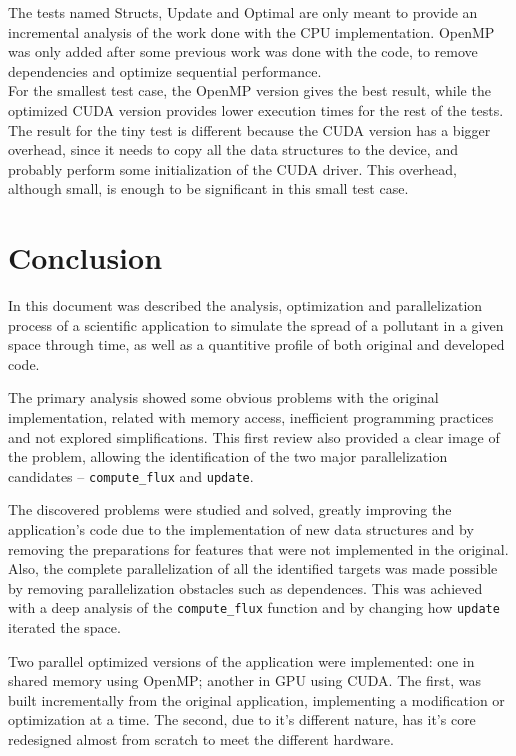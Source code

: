 \documentclass[9pt,twocolumn]{scrartcl}
\begin{document}
The tests named Structs, Update and Optimal are only meant to provide an incremental analysis of the work done with the CPU implementation. OpenMP was only added after some previous work was done with the code, to remove dependencies and optimize sequential performance.\\
For the smallest test case, the OpenMP version gives the best result, while the optimized CUDA version provides lower execution times for the rest of the tests. The result for the tiny test is different because the CUDA version has a bigger overhead, since it needs to copy all the data structures to the device, and probably perform some initialization of the CUDA driver. This overhead, although small, is enough to be significant in this small test case.

\section{Conclusion}
\label{sec:conclusion}
In this document was described the analysis, optimization and parallelization process of a scientific application to simulate the spread of a pollutant in a given space through time, as well as a quantitive profile of both original and developed code.

The primary analysis showed some obvious problems with the original implementation, related with memory access, inefficient programming practices and not explored simplifications. This first review also provided a clear image of the problem, allowing the identification of the two major parallelization candidates -- \texttt{compute\_flux} and \texttt{update}.

The discovered problems were studied and solved, greatly improving the application's code due to the implementation of new data structures and by removing the preparations for features that were not implemented in the original. Also, the complete parallelization of all the identified targets was made possible by removing parallelization obstacles such as dependences. This was achieved with a deep analysis of the \texttt{compute\_flux} function and by changing how \texttt{update} iterated the space.

Two parallel optimized versions of the application were implemented: one in shared memory using OpenMP; another in GPU using CUDA. The first, was built incrementally from the original application, implementing a modification or optimization at a time. The second, due to it's different nature, has it's core redesigned almost from scratch to meet the different hardware.
\end{document}
